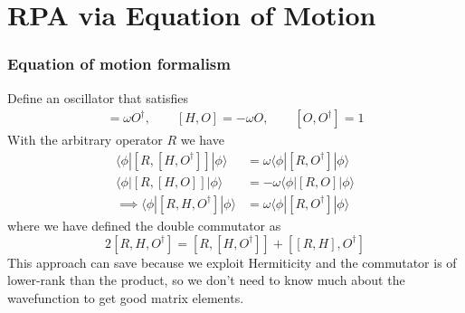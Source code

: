 \section{RPA via Equation of Motion}
\begin{frame}
    \frametitle{Equation of motion formalism}
Define an oscillator that satisfies 
\begin{align}
    [H, O^\dag] = \omega O^\dag , \quad  \quad [H, O] = -\omega O , \quad \quad [O, O^\dag] = 1
\end{align}
With the arbitrary operator $R$ we have
\begin{align}
\langle \phi | [R,[H, O^\dagger]] | \phi \rangle &= \omega \langle \phi | [R, O^\dagger] | \phi \rangle\\
\langle \phi | [R,[H, O]] | \phi \rangle 
    &= -\omega \langle \phi | [R, O] | \phi \rangle\\
    \implies\langle\phi|\left[R, H, O^{\dagger}\right]|\phi\rangle&=\omega\langle\phi|\left[R, O^{\dagger}\right]|\phi\rangle
\label{duble_commutator}
\end{align}
where we have defined the double commutator as
\begin{equation}
    2\left[R, H, O^{\dagger}\right]=\left[R,\left[H, O^{\dagger}\right]\right]+\left[[R, H], O^{\dagger}\right] 
\end{equation}
This approach can save because we exploit Hermiticity and the commutator is of lower-rank than the product, so we don't need to know much about the wavefunction to get good matrix elements.
\end{frame}


